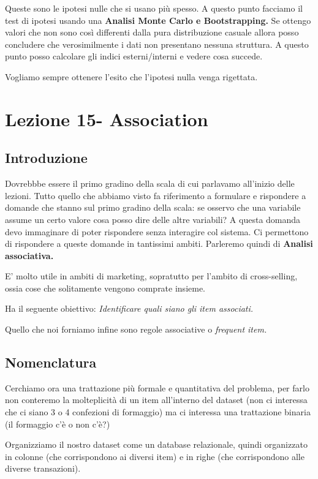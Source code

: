 \documentclass[12pt, a4paper,titlepage,openany]{article}
\begin{document}
Queste sono le ipotesi nulle che si usano più spesso. A questo punto facciamo il test di ipotesi usando una \textbf{Analisi Monte Carlo e Bootstrapping.} Se ottengo valori che non sono così differenti dalla pura distribuzione casuale allora posso concludere che verosimilmente i dati non presentano nessuna struttura. A questo punto posso calcolare gli indici esterni/interni e vedere cosa succede.

Vogliamo sempre ottenere l'esito che l'ipotesi nulla venga rigettata.

\section{Lezione 15- Association}
\subsection{Introduzione}

Dovrebbbe essere il primo gradino della scala di cui parlavamo all'inizio delle lezioni. Tutto quello che abbiamo visto fa riferimento a formulare e rispondere a domande che stanno sul primo gradino della scala: se osservo che una variabile assume un certo valore cosa posso dire delle altre variabili?  A questa domanda devo immaginare di poter rispondere senza interagire col sistema. Ci permettono di rispondere a queste domande in tantissimi ambiti. Parleremo quindi di \textbf{Analisi associativa.}

E' molto utile in ambiti di marketing, sopratutto per l'ambito di cross-selling, ossia cose che solitamente vengono comprate insieme.

Ha il seguente obiettivo: \textit{Identificare quali siano gli item associati.}

Quello che noi forniamo infine sono regole associative o \textit{frequent item.} 

\subsection{Nomenclatura}
Cerchiamo ora una trattazione più formale e quantitativa del problema, per farlo non conteremo la molteplicità di un item all'interno del dataset (non ci interessa che ci siano 3 o 4 confezioni di formaggio) ma ci interessa una trattazione binaria (il formaggio c'è o non c'è?)


Organizziamo il nostro dataset come un database relazionale, quindi organizzato in colonne (che corrispondono ai diversi item) e in righe (che corrispondono alle diverse transazioni).
\end{document}
